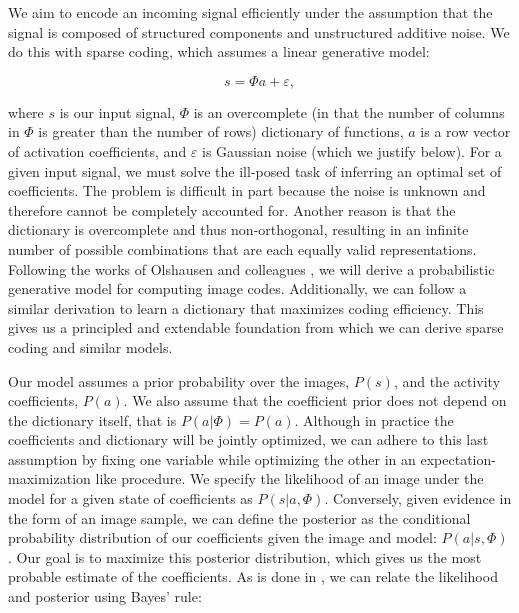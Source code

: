 We aim to encode an incoming signal efficiently under the assumption that the signal is composed of structured components and unstructured additive noise. We do this with sparse coding, which assumes a linear generative model:

\begin{equation} \label{eq:ch2_sparse_generative_model}
    s = \Phi a + \varepsilon,
\end{equation}

\noindent where $s$ is our input signal, $\Phi$ is an overcomplete (in that the number of columns in $\Phi$ is greater than the number of rows) dictionary of functions, $a$ is a row vector of activation coefficients, and $\varepsilon$ is Gaussian noise (which we justify below). For a given input signal, we must solve the ill-posed task of inferring an optimal set of coefficients. The problem is difficult in part because the noise is unknown and therefore cannot be completely accounted for. Another reason is that the dictionary is overcomplete and thus non-orthogonal, resulting in an infinite number of possible combinations that are each equally valid representations. Following the works of Olshausen and colleagues \parencite{olshausen1996learning, olshausen2003principles, karklin1999porbabilistic}, we will derive a probabilistic generative model for computing image codes. Additionally, we can follow a similar derivation to learn a dictionary that maximizes coding efficiency. This gives us a principled and extendable foundation from which we can derive sparse coding and similar models.

Our model assumes a prior probability over the images, $P(s)$, and the activity coefficients, $P(a)$. We also assume that the coefficient prior does not depend on the dictionary itself, that is $P(a|\Phi) = P(a)$. Although in practice the coefficients and dictionary will be jointly optimized, we can adhere to this last assumption by fixing one variable while optimizing the other in an expectation-maximization like procedure. We specify the likelihood of an image under the model for a given state of coefficients as $P(s|a,\Phi)$. Conversely, given evidence in the form of an image sample, we can define the posterior as the conditional probability distribution of our coefficients given the image and model: $P(a|s,\Phi)$. Our goal is to maximize this posterior distribution, which gives us the most probable estimate of the coefficients. As is done in \parencite{karklin1999porbabilistic}, we can relate the likelihood and posterior using Bayes' rule:

